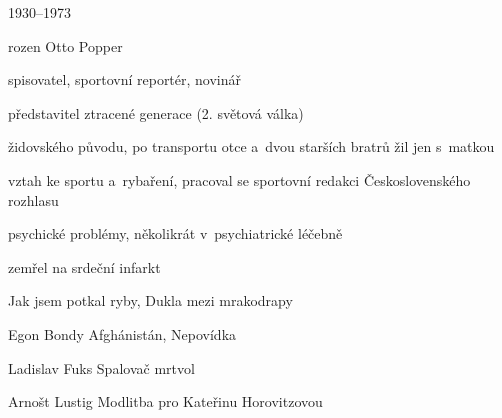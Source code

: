{\parag{\getauthor}
\begin{compactitem}
	\item 1930--1973
	\item rozen Otto Popper
	\item spisovatel, sportovní reportér, novinář
	\item představitel ztracené generace (2. světová válka)
	\item židovského původu, po transportu otce a~dvou starších bratrů žil jen s~matkou
	\item vztah ke sportu a~rybaření, pracoval se sportovní redakci Československého rozhlasu
	\item psychické problémy, několikrát v~psychiatrické léčebně
	\item zemřel na srdeční infarkt
	\item Jak jsem potkal ryby, Dukla mezi mrakodrapy
\end{compactitem}

\begin{compactdesc}
	\item[Egon Bondy] Afghánistán, Nepovídka
	\item[Ladislav Fuks] Spalovač mrtvol
	\item[Arnošt Lustig] Modlitba pro Kateřinu Horovitzovou
\end{compactdesc}
}

